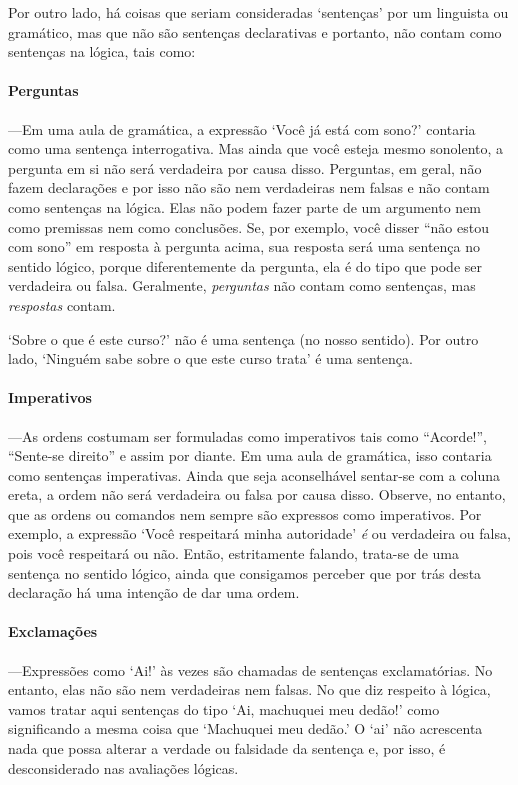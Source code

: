 Por outro lado, há coisas que seriam consideradas `sentenças' por um linguista ou gramático, mas que não são sentenças declarativas e portanto, não contam como sentenças na lógica, tais como:

\paragraph{Perguntas}---Em uma aula de gramática, a expressão `Você já está com sono?'  contaria como uma sentença interrogativa. Mas ainda que você esteja mesmo sonolento, a pergunta em si não será verdadeira por causa disso.
Perguntas, em geral, não fazem declarações e por isso não são nem verdadeiras nem falsas e não contam como sentenças na lógica.
Elas não podem fazer parte de um argumento nem como premissas nem como conclusões.
Se, por exemplo, você disser ``não estou com sono'' em resposta à pergunta acima, sua resposta será uma sentença no sentido lógico, porque diferentemente da pergunta, ela é do tipo que pode ser verdadeira ou falsa.
Geralmente, \emph{perguntas} não contam como sentenças, mas \emph{respostas} contam.

`Sobre o que é este curso?' não é uma sentença (no nosso sentido).
Por outro lado, `Ninguém sabe sobre o que este curso trata' é uma sentença.

\paragraph{Imperativos}---As ordens costumam ser formuladas como imperativos tais como ``Acorde!'', ``Sente-se direito'' e assim por diante.
Em uma aula de gramática, isso contaria como sentenças imperativas.
Ainda que seja aconselhável sentar-se com a coluna ereta, a ordem não será verdadeira ou falsa por causa disso.
Observe, no entanto, que as ordens ou comandos nem sempre são expressos como imperativos.
Por exemplo, a expressão `Você respeitará minha autoridade' \emph{é} ou verdadeira ou falsa, pois você respeitará ou não.
Então, estritamente falando, trata-se de uma sentença no sentido lógico, ainda que consigamos perceber que por trás desta declaração há uma intenção de dar uma ordem.

\paragraph{Exclamações}---Expressões como `Ai!' às vezes são chamadas de sentenças exclamatórias.
No entanto, elas não são nem verdadeiras nem falsas.
No que diz respeito à lógica, vamos tratar aqui sentenças do tipo `Ai, machuquei meu dedão!' como significando a mesma coisa que `Machuquei meu dedão.'
O `ai' não acrescenta nada que possa alterar a verdade ou falsidade da sentença e, por isso, é desconsiderado nas avaliações lógicas.



